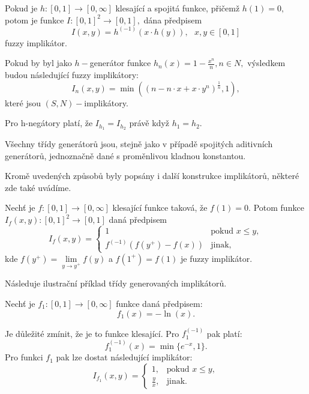 \begin{sentence}\cite{Springer} 
Pokud je $h: [0,1] \to [0,\infty]$ klesající a spojitá funkce,
přičemž $h(1) = 0,$ potom je funkce $I: [0,1]^2 \to [0,1],$ dána předpisem
$$I(x,y) = h^{(-1)}(x \cdot h(y)), \mbox {   } x, y \in [0,1]$$
fuzzy implikátor. \\
\end{sentence}
\begin{example}
    Pokud by byl jako  $h-$generátor funkce $h_n(x) = 1- \frac {x^n}{n}, n
    \in N,$ výsledkem budou následující fuzzy implikátory:
    $$I_n(x,y) = \min \left ( (n - n \cdot x + x \cdot y^n)^{\frac 1n}, 1\right
    ),$$
    kter\'e jsou $(S,N)-$implikátory.
\end{example}
\begin{remark}
    Pro h-negátory platí, že $I_{h_1} = I_{h_2}$ právě když $h_1 = h_2.$
\end{remark}

Všechny třídy generátor\r u jsou, stejně jako v případě spojitých aditivních generátor\r u, jednoznačně dané s proměnlivou kladnou konstantou.

Krom\v e uveden\'ych zp\r usob\r u byly pops\'any i dal\v s\'i konstrukce implik\'ator\r u, n\v ekter\'e zde tak\'e uv\'ad\'ime.

\begin{sentence}
\cite{Springer}
    Nech\v t je  $f:[0,1]\rightarrow [0,\infty]$ klesající funkce taková, \v ze $f(1)=0$. 
Potom funkce $I_f(x,y):[0,1]^2\rightarrow [0,1]$ dan\'a předpisem
 $$I_f(x,y)=\begin{cases} 1 & \mbox{pokud $x \leq y$},\\
f^{(-1)}(f(y^+)-f(x)) & \mbox{jinak,} \end{cases}$$
kde $f(y^+)= \lim\limits_{y \to y^+}f(y)$ a $f(1^+)=f(1)$
je fuzzy implik\'ator. \\
\end{sentence}

Následuje ilustrační příklad třídy generovaných implikátor\r u.\\
\begin{example}
    Nech\v t je $f_1:[0,1] \rightarrow [0,
\infty]$ funkce daná předpisem:
 $$f_1(x)= -\ln(x).$$

Je d\r uležité zmínit, že je to funkce klesající. Pro $f_1^{(-1)}$ pak platí:
 $$f_1^{(-1)}(x)=\min \{ e^{-x},1 \}.$$
Pro  funkci $f_1$ pak lze dostat následující implik\'ator:
$$I_{f_1}(x,y)= \begin{cases} 1,    &\mbox{pokud $x \leq y$}, \\
  \frac{y}{x},   & \mbox{jinak.} \end{cases}$$
\end{example}


